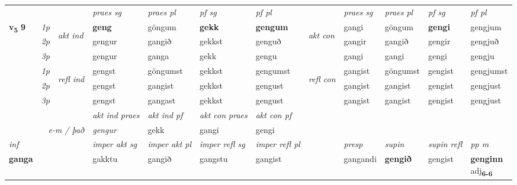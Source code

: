 \begin{longtable}[l]{X>{\footnotesize\itshape}llXXXXlXXXX}
\midrule
 & &   & \textit{praes sg}  & \textit{praes pl}    & \textit{ pf sg} & \textit{pf pl} & & \textit{praes sg}  & \textit{praes pl}    & \textit{pf sg} & \textit{pf pl }  \\ \cmidrule{4-7} \cmidrule{9-12}
 \multirow{2}{*}{{{\textbf{v{\textsubscript{5}}} \Large{\textbf{9}}}}}  & 1p & \multirow{3}{*}{\begin{turn}{90}\textit{akt ind}\end{turn}} & \textbf{geng} & göngum & \textbf{gekk} & \textbf{gengum} & \multirow{3}{*}{\begin{turn}{90}\textit{akt con}\end{turn}} &gangi & göngum & \textbf{gengi} & gengjum\\*
 & 2p &  &  gengur  & gangið & gekkst & genguð & & gangir & gangið & gengir & gengjuð \\*
 & 3p &  & gengur & ganga & gekk & gengu & & gangi & gangi& gengi & gengju \\*
\cmidrule{4-7} \cmidrule{9-12}
 & 1p & \multirow{3}{*}{\begin{turn}{90}\textit{refl ind}\end{turn}}  & gengst & göngumst & gekkst & gengumst & \multirow{3}{*}{\begin{turn}{90}\textit{refl con}\end{turn}}  &gangist & göngumst & gengist & gengjumst \\*
 & 2p &  & gengst & gangist & gekkst & gengust & &gangist & gangist & gengist & gengjust \\*
 & 3p  & & gengst & gangast & gekkst & gengust & & gangist & gangist& gengist & gengjust \\*
\cmidrule{4-7} \cmidrule{9-12}

   && &  \textit{akt ind praes} & \textit{akt ind pf} & \textit{akt con praes} & \textit{akt con pf} \\*
\multicolumn{3}{r}{\textit{e-m / það}} & gengur & gekk & gangi & gengi \\*

\cmidrule{4-7}
   {\textit{inf}} & &  & \textit{imper akt sg} & \textit{imper akt pl} & \textit{imper refl sg} & \textit{imper refl pl} && \textit{presp} & \textit{supin} & \textit{supin refl} & \textit{pp m} \\*
  {\textbf{ganga}} & && gakktu  & gangið & gangstu & gangist && gangandi &  \textbf{gengið} & gengist & \specialcell{\textbf{genginn} \\ adj\textbf{\textsubscript{6-6}}} \\*


\end{longtable}
